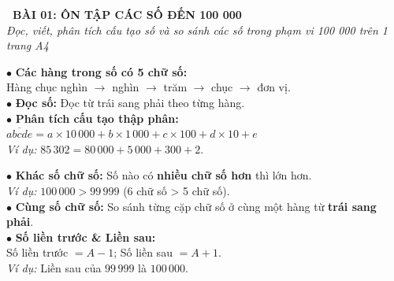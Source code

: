 \documentclass[14pt,a4paper,oneside]{extbook}
\begin{document}
\noindent
\begin{tcolorbox}[
  enhanced,
  colback=teal!8!white,
  colframe=teal!80!black,
  arc=3mm, boxrule=1pt,
  left=3mm, right=3mm, top=2mm, bottom=2mm,
  halign=center
]
  {\Large\bfseries\color{teal!90!black}\faBookmark\ BÀI 01: ÔN TẬP CÁC SỐ ĐẾN 100 000}\\[1.5pt]
  {\footnotesize\itshape\color{black!75} Đọc, viết, phân tích cấu tạo số và so sánh các số trong phạm vi 100 000 trên 1 trang A4}
\end{tcolorbox}

\vspace{2.5mm}

\noindent
\begin{minipage}[t]{0.49\textwidth}
  \begin{tcolorbox}[
    enhanced,
    title={\footnotesize\bfseries\color{white}\faListUl\ 1. Đọc, viết \& Cấu tạo số},
    colback=blue!2!white,
    colframe=blue!75!black,
    arc=2.5mm, boxrule=0.8pt, top=1.8mm, bottom=1.8mm, left=2mm, right=2mm
  ]
    \footnotesize
    $\bullet$ \textbf{Các hàng trong số có 5 chữ số:}\\
    Hàng chục nghìn $\rightarrow$ nghìn $\rightarrow$ trăm $\rightarrow$ chục $\rightarrow$ đơn vị.\\
    $\bullet$ \textbf{Đọc số:} Đọc từ trái sang phải theo từng hàng.\\
    $\bullet$ \textbf{Phân tích cấu tạo thập phân:}\\
    $\overline{abcde} = a \times 10\,000 + b \times 1\,000 + c \times 100 + d \times 10 + e$\\
    \textit{Ví dụ:} $85\,302 = 80\,000 + 5\,000 + 300 + 2$.
  \end{tcolorbox}
\end{minipage}%
\hfill
\begin{minipage}[t]{0.49\textwidth}
  \begin{tcolorbox}[
    enhanced,
    title={\footnotesize\bfseries\color{white}\faBalanceScale\ 2. So sánh \& Thứ tự số},
    colback=teal!2!white,
    colframe=teal!75!black,
    arc=2.5mm, boxrule=0.8pt, top=1.8mm, bottom=1.8mm, left=2mm, right=2mm
  ]
    \footnotesize
    $\bullet$ \textbf{Khác số chữ số:} Số nào có \textbf{nhiều chữ số hơn} thì lớn hơn.\\
    \textit{Ví dụ:} $100\,000 > 99\,999$ (6 chữ số > 5 chữ số).\\
    $\bullet$ \textbf{Cùng số chữ số:} So sánh từng cặp chữ số ở cùng một hàng từ \textbf{trái sang phải}.\\
    $\bullet$ \textbf{Số liền trước \& Liền sau:}\\
    Số liền trước $= A - 1$; Số liền sau $= A + 1$.\\
    \textit{Ví dụ:} Liền sau của $99\,999$ là $100\,000$.
  \end{tcolorbox}
\end{minipage}
\end{document}
